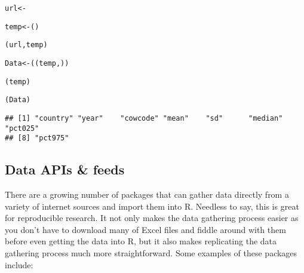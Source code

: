 {\scriptsize
\begin{knitrout}
\color{fgcolor}\begin{kframe}
\begin{alltt}
url <- 

temp <- ()

(url, temp)

Data <- ((temp, ))

(temp)

(Data)
\end{alltt}
\begin{verbatim}
## [1] "country" "year"    "cowcode" "mean"    "sd"      "median"  "pct025" 
## [8] "pct975"
\end{verbatim}
\end{kframe}
\end{knitrout}

}

\subsection{Data APIs \& feeds}


There are a growing number of packages that can gather data directly from a variety of internet sources and import them into R. Needless to say, this is great for reproducible research. It not only makes the data gathering process easier as you don't have to download many of Excel files and fiddle around with them before even getting the data into R, but it also makes replicating the data gathering process much more straightforward. Some examples of these packages include: 

